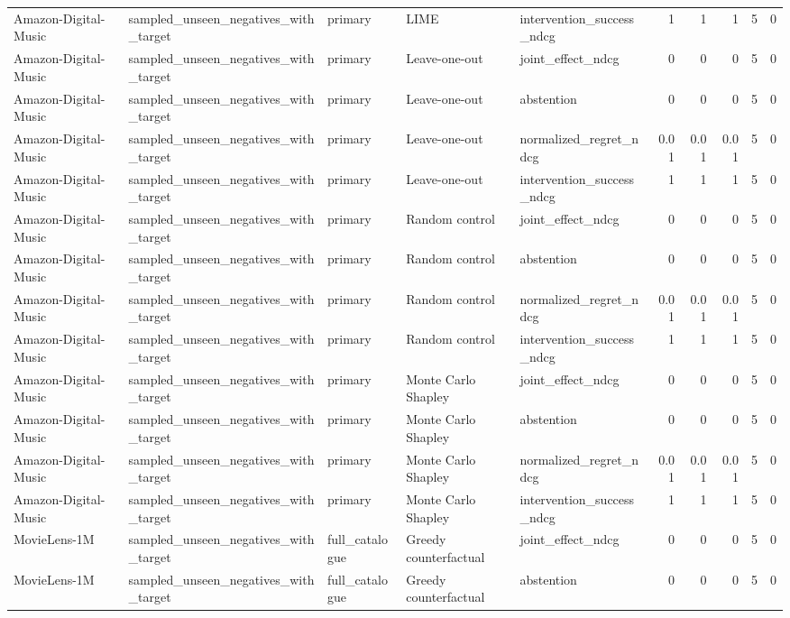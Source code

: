 \begin{table}[t]
{\begin{tabular}{lllllrrrrr}
Amazon-Digital-Music & sampled\_unseen\_negatives\_with\_target & primary & LIME & intervention\_success\_ndcg & 1 & 1 & 1 & 5 & 0 \\
Amazon-Digital-Music & sampled\_unseen\_negatives\_with\_target & primary & Leave-one-out & joint\_effect\_ndcg & 0 & 0 & 0 & 5 & 0 \\
Amazon-Digital-Music & sampled\_unseen\_negatives\_with\_target & primary & Leave-one-out & abstention & 0 & 0 & 0 & 5 & 0 \\
Amazon-Digital-Music & sampled\_unseen\_negatives\_with\_target & primary & Leave-one-out & normalized\_regret\_ndcg & 0.01 & 0.01 & 0.01 & 5 & 0 \\
Amazon-Digital-Music & sampled\_unseen\_negatives\_with\_target & primary & Leave-one-out & intervention\_success\_ndcg & 1 & 1 & 1 & 5 & 0 \\
Amazon-Digital-Music & sampled\_unseen\_negatives\_with\_target & primary & Random control & joint\_effect\_ndcg & 0 & 0 & 0 & 5 & 0 \\
Amazon-Digital-Music & sampled\_unseen\_negatives\_with\_target & primary & Random control & abstention & 0 & 0 & 0 & 5 & 0 \\
Amazon-Digital-Music & sampled\_unseen\_negatives\_with\_target & primary & Random control & normalized\_regret\_ndcg & 0.01 & 0.01 & 0.01 & 5 & 0 \\
Amazon-Digital-Music & sampled\_unseen\_negatives\_with\_target & primary & Random control & intervention\_success\_ndcg & 1 & 1 & 1 & 5 & 0 \\
Amazon-Digital-Music & sampled\_unseen\_negatives\_with\_target & primary & Monte Carlo Shapley & joint\_effect\_ndcg & 0 & 0 & 0 & 5 & 0 \\
Amazon-Digital-Music & sampled\_unseen\_negatives\_with\_target & primary & Monte Carlo Shapley & abstention & 0 & 0 & 0 & 5 & 0 \\
Amazon-Digital-Music & sampled\_unseen\_negatives\_with\_target & primary & Monte Carlo Shapley & normalized\_regret\_ndcg & 0.01 & 0.01 & 0.01 & 5 & 0 \\
Amazon-Digital-Music & sampled\_unseen\_negatives\_with\_target & primary & Monte Carlo Shapley & intervention\_success\_ndcg & 1 & 1 & 1 & 5 & 0 \\
MovieLens-1M & sampled\_unseen\_negatives\_with\_target & full\_catalogue & Greedy counterfactual & joint\_effect\_ndcg & 0 & 0 & 0 & 5 & 0 \\
MovieLens-1M & sampled\_unseen\_negatives\_with\_target & full\_catalogue & Greedy counterfactual & abstention & 0 & 0 & 0 & 5 & 0 \\

\end{tabular}}
\end{table}
